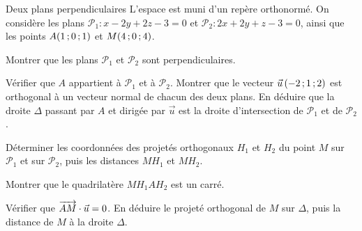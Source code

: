 \begin{exercice}[2]{Deux plans perpendiculaires\enspace\otNouveau}
L'espace est muni d'un repère orthonormé. On considère les plans $\mathcal{P}_1:x-2y+2z-3=0$ et $\mathcal{P}_2:2x+2y+z-3=0$, ainsi que
les points $A(1\,{;}\,0\,{;}\,1)$ et $M(4\,{;}\,0\,{;}\,4)$.
\begin{questions}
  \item Montrer que les plans $\mathcal{P}_1$ et $\mathcal{P}_2$ sont perpendiculaires.
  \item Vérifier que $A$ appartient à $\mathcal{P}_1$ et à $\mathcal{P}_2$. Montrer que le vecteur $\vec u\,(-2\,{;}\,1\,{;}\,2)$ est orthogonal
    à un vecteur normal de chacun des deux plans. En déduire que la droite $\Delta$ passant par $A$ et dirigée par $\vec u$ est la
    droite d'intersection de $\mathcal{P}_1$ et de $\mathcal{P}_2$.
  \item Déterminer les coordonnées des projetés orthogonaux $H_1$ et $H_2$ du point $M$ sur $\mathcal{P}_1$ et sur $\mathcal{P}_2$,
    puis les distances $MH_1$ et $MH_2$.
  \item Montrer que le quadrilatère $MH_1AH_2$ est un carré.
  \item Vérifier que $\overrightarrow{AM}\cdot\vec u=0$. En déduire le projeté orthogonal de $M$ sur $\Delta$, puis la distance de $M$ à la
    droite $\Delta$.
\end{questions}
\end{exercice}


